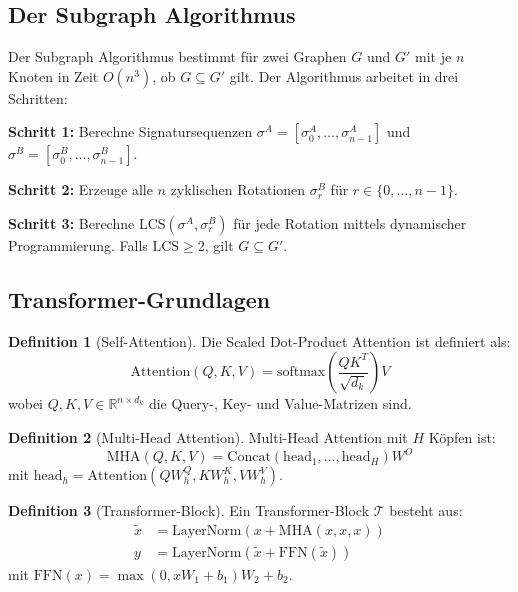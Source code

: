 ﻿\documentclass[a4paper,12pt]{article}
\theoremstyle{definition}
\newtheorem{definition}{Definition}
\begin{document}
\subsection{Der Subgraph Algorithmus}

Der Subgraph Algorithmus \cite{epp2026subgraph} bestimmt für zwei Graphen $G$
und $G'$ mit je $n$ Knoten in Zeit $O(n^3)$, ob $G \subseteq G'$ gilt.
Der Algorithmus arbeitet in drei Schritten:

\textbf{Schritt 1:} Berechne Signatursequenzen $\sigma^A = [\sigma_0^A, \ldots, \sigma_{n-1}^A]$
und $\sigma^B = [\sigma_0^B, \ldots, \sigma_{n-1}^B]$.

\textbf{Schritt 2:} Erzeuge alle $n$ zyklischen Rotationen $\sigma^B_r$
für $r \in \{0, \ldots, n-1\}$.

\textbf{Schritt 3:} Berechne $\mathrm{LCS}(\sigma^A, \sigma^B_r)$ für
jede Rotation mittels dynamischer Programmierung. Falls $\mathrm{LCS} \geq 2$,
gilt $G \subseteq G'$.

\subsection{Transformer-Grundlagen}

\begin{definition}[Self-Attention]
	Die Scaled Dot-Product Attention ist definiert als:
	\[
	\mathrm{Attention}(Q, K, V) = \mathrm{softmax}\!\left(\frac{QK^T}{\sqrt{d_k}}\right) V
	\]
	wobei $Q, K, V \in \mathbb{R}^{n \times d_k}$ die Query-, Key- und Value-Matrizen sind.
\end{definition}

\begin{definition}[Multi-Head Attention]
	Multi-Head Attention mit $H$ Köpfen ist:
	\[
	\mathrm{MHA}(Q, K, V) = \mathrm{Concat}(\mathrm{head}_1, \ldots, \mathrm{head}_H) W^O
	\]
	mit $\mathrm{head}_h = \mathrm{Attention}(QW_h^Q, KW_h^K, VW_h^V)$.
\end{definition}

\begin{definition}[Transformer-Block]
	Ein Transformer-Block $\mathcal{T}$ besteht aus:
	\begin{align}
	\tilde{x} &= \mathrm{LayerNorm}(x + \mathrm{MHA}(x, x, x)) \\
	y &= \mathrm{LayerNorm}(\tilde{x} + \mathrm{FFN}(\tilde{x}))
	\end{align}
	mit $\mathrm{FFN}(x) = \max(0, xW_1 + b_1)W_2 + b_2$.
\end{definition}
\end{document}
